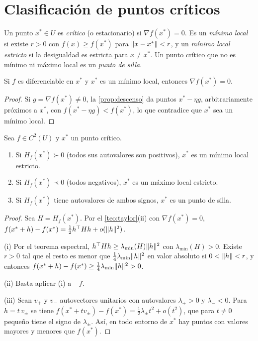 \section{Clasificación de puntos críticos}

\begin{definicion}
Un punto $x^{*}\in U$ es \emph{crítico} (o estacionario) si $\nabla f(x^{*})=0$. Es un \emph{mínimo local} si existe $r>0$ con $f(x)\ge f(x^{*})$ para $\lVert x-x^{*}\rVert<r$, y un \emph{mínimo local estricto} si la desigualdad es estricta para $x\ne x^{*}$. Un punto crítico que no es mínimo ni máximo local es un \emph{punto de silla}.
\end{definicion}

\begin{teorema}\label{teo:fermat}
Si $f$ es diferenciable en $x^{*}$ y $x^{*}$ es un mínimo local, entonces $\nabla f(x^{*})=0$.
\end{teorema}

\begin{proof}
Si $g=\nabla f(x^{*})\ne 0$, la \cref{prop:descenso} da puntos $x^{*}-\eta g$, arbitrariamente próximos a $x^{*}$, con $f(x^{*}-\eta g)<f(x^{*})$, lo que contradice que $x^{*}$ sea un mínimo local.
\end{proof}

\begin{teorema}\label{teo:criterio}
Sea $f\in C^{2}(U)$ y $x^{*}$ un punto crítico.
\begin{enumerate}
  \item Si $H_f(x^{*})\succ 0$ (todos sus autovalores son positivos), $x^{*}$ es un mínimo local estricto.
  \item Si $H_f(x^{*})\prec 0$ (todos negativos), $x^{*}$ es un máximo local estricto.
  \item Si $H_f(x^{*})$ tiene autovalores de ambos signos, $x^{*}$ es un punto de silla.
\end{enumerate}
\end{teorema}

\begin{proof}
Sea $H=H_f(x^{*})$. Por el \cref{teo:taylor}(ii) con $\nabla f(x^{*})=0$, $f(x^{*}+h)-f(x^{*})=\tfrac12h^{\top} Hh+o(\lVert h\rVert^{2})$.

(i) Por el teorema espectral, $h^{\top} Hh\ge\lambda_{\min}(H)\lVert h\rVert^{2}$ con $\lambda_{\min}(H)>0$. Existe $r>0$ tal que el resto es menor que $\tfrac14\lambda_{\min}\lVert h\rVert^{2}$ en valor absoluto si $0<\lVert h\rVert<r$, y entonces $f(x^{*}+h)-f(x^{*})\ge\tfrac14\lambda_{\min}\lVert h\rVert^{2}>0$.

(ii) Basta aplicar (i) a $-f$.

(iii) Sean $v_+$ y $v_-$ autovectores unitarios con autovalores $\lambda_+>0$ y $\lambda_-<0$. Para $h=t\,v_\pm$ se tiene $f(x^{*}+tv_\pm)-f(x^{*})=\tfrac12\lambda_\pm t^{2}+o(t^{2})$, que para $t\ne 0$ pequeño tiene el signo de $\lambda_\pm$. Así, en todo entorno de $x^{*}$ hay puntos con valores mayores y menores que $f(x^{*})$.
\end{proof}

